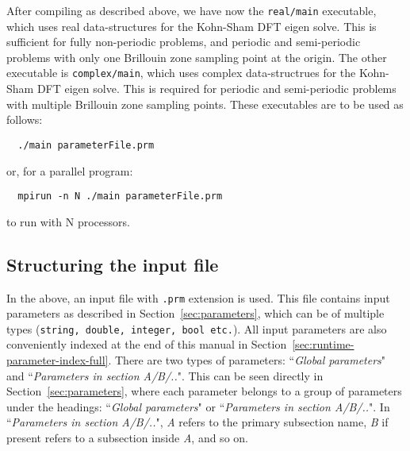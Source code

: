 After compiling \dftfe{} as described above, we have now the \verb|real/main| executable, which uses real data-structures for the Kohn-Sham DFT eigen solve. This is sufficient for fully non-periodic problems, and periodic and semi-periodic problems with only one Brillouin zone sampling point at the origin. The other executable is \verb|complex/main|, which uses complex data-structrues for the Kohn-Sham DFT eigen solve. This is required for periodic and semi-periodic problems with multiple Brillouin zone sampling points. These executables are to be used as follows:
\begin{verbatim}
  ./main parameterFile.prm
\end{verbatim}
or, for a parallel program:
\begin{verbatim}
  mpirun -n N ./main parameterFile.prm
\end{verbatim}
to run with N processors. 
\subsection{Structuring the input file}
In the above, an input file with \verb|.prm| extension is used. This file contains input parameters as described in Section~\ref{sec:parameters}, which can be of multiple types (\verb|string, double, integer, bool etc.|). All input parameters are also conveniently indexed at the end of this manual in Section~\ref{sec:runtime-parameter-index-full}. There are two types of parameters: ``{\it Global parameters}" and ``{\it Parameters in section A/B/..}". This can be seen directly in Section~\ref{sec:parameters}, where each parameter belongs to a group of parameters under the headings: ``{\it Global parameters}" or ``{\it Parameters in section A/B/..}". In ``{\it Parameters in section A/B/..}", {\it A} refers to the primary subsection name, {\it B} if present refers to a subsection inside {\it A}, and so on. 

